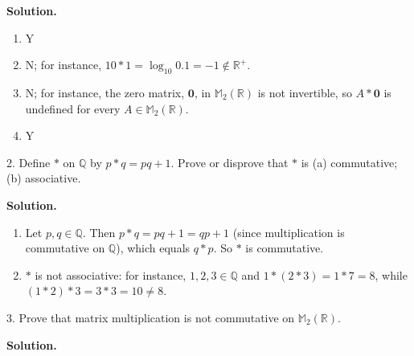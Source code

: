 \documentclass[10pt,]{book}
\theoremstyle{plain}
\theoremstyle{definition}
\theoremstyle{definition}
\theoremstyle{definition}
\theoremstyle{definition}
\numberwithin{equation}{section}
\def\R{\mathbb{R}}
\def\Q{\mathbb{Q}}
\def\M{\mathbb{M}}
\def\0{\mathbf 0}
\begin{document}
\begin{exerciselist}
\par\smallskip
\par\smallskip
\noindent\textbf{Solution.}\hypertarget{solution-7}{}\quad
\leavevmode%
\begin{enumerate}[label=(\alph*)]
\item\hypertarget{li-62}{}
          Y
\item\hypertarget{li-63}{}
          N; for instance, \(10*1=\log_{10}0.1=-1\not\in\R^+\).
\item\hypertarget{li-64}{}
          N; for instance, the zero matrix, \(\0\), in \(\M_2(\R)\) is not invertible, so \(A*\0\) is undefined for every \(A\in\M_2(\R)\).
\item\hypertarget{li-65}{}
          Y
\end{enumerate}
\item[2.]\hypertarget{exercise-8}{}
        Define \(*\) on \(\Q\) by \(p*q=pq+1\). Prove or disprove that \(*\) is (a) commutative; (b) associative.
\par\smallskip
\par\smallskip
\noindent\textbf{Solution.}\hypertarget{solution-8}{}\quad
\leavevmode%
\begin{enumerate}[label=(\alph*)]
\item\hypertarget{li-66}{}
          Let \(p,q\in \Q\).  Then \(p*q=pq+1=qp+1\) (since multiplication is commutative on \(\Q\)), which equals \(q*p\).  So \(*\) is commutative.
\item\hypertarget{li-67}{}
          \(*\) is not associative: for instance, \(1,2,3\in \Q\) and \(1*(2*3)=1*7=8\), while \((1*2)*3=3*3=10\neq 8\).
\end{enumerate}
\item[3.]\hypertarget{exercise-9}{}
        Prove that matrix multiplication is not commutative on \(\M_2(\R)\).
\par\smallskip
\par\smallskip
\noindent\textbf{Solution.}\hypertarget{solution-9}{}\quad


\end{exerciselist}
\end{document}
